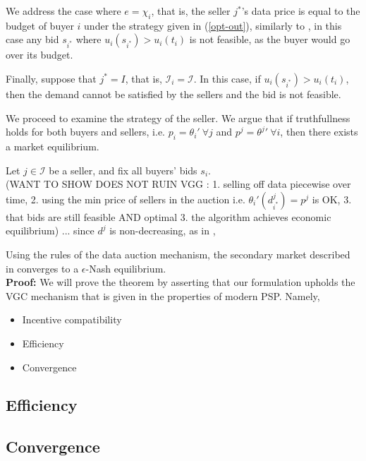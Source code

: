 \documentclass[12pt]{article}
\theoremstyle{definition}
\newcommand{\mcI}{\mathcal{I}}
\begin{document}
\begin{multicols}{2}
We address the case where $e=\chi_i$, that is, the seller $j^*$'s data price is
equal to the budget of buyer $i$ under the strategy given in
(\ref{opt-out}), similarly to \cite{semret}, in this case any bid $s_{i^*}$
where $u_i(s_{i^*}) > u_i(t_i)$ is not feasible, as the buyer would go over its
budget.

Finally, suppose that $j^* = I$, that is, $\mcI_i = \mcI$. 
In this case, if $u_i(s_{i^*}) > u_i(t_i)$, then
the demand cannot be satisfied by the sellers and the bid is not feasible. 

We proceed to examine the strategy of the seller. We argue that if
truthfullness holds for both buyers and sellers, i.e. $p_i ={\theta_i}' \
\forall j$ and $p^j = {\theta^j}' \ \forall i$, then there exists a market
equilibrium.

{
\label{sellerincentivecompatibility}
Let $j\in\mcI$ be a seller, and fix all buyers' bids
$s_i$. \\
(WANT TO SHOW DOES NOT RUIN VGG : 1. selling off data piecewise over time, 2.
using the min price of sellers in the auction i.e. ${\theta_i}'(d_{i^*}^j) =
p^j$ is OK, 3. that bids are still feasible
AND optimal 3. the algorithm achieves economic equilibrium)
... since $d^j$ is non-decreasing, as in \cite{lazar}, \cite{semret}
}

{
Using the rules of the data auction mechanism, the secondary market described in \cite{zheng} converges to a $\epsilon$-Nash equilibrium.
}\\
\textbf{Proof:}
We will prove the theorem by asserting that our formulation upholds the VGC
mechanism that is given in the properties of modern PSP. Namely,
\begin{itemize}
    \item Incentive compatibility
    \item Efficiency 
    \item Convergence
\end{itemize}

\subsection{Efficiency}

\subsection{Convergence}

\end{multicols}
\end{document}
